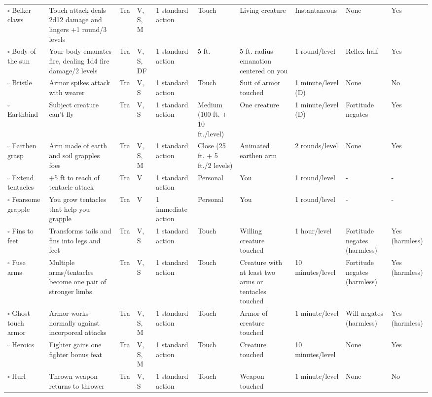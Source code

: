 \documentclass[12pt, a4paper]{article}
\begin{document}
\begin{center}
\begin{longtable}[H]{ p{8em} p{15em} p{2em} p{5em} p{6em} p{6em} p{10em} p{6em} p{5em} p{2em} }
    \(\square\) Belker claws & Touch attack deals 2d12 damage and lingers +1 round/3 levels & Tra & V, S, M & 1 standard action & Touch & Living creature & Instantaneous & None & Yes\\
    \(\square\) Body of the sun & Your body emanates ﬁre, dealing 1d4 ﬁre damage/2 levels & Tra & V, S, DF & 1 standard action & 5 ft. & 5-ft.-radius emanation centered on you & 1 round/level & Reﬂex half & Yes\\
    \(\square\) Bristle & Armor spikes attack with wearer & Tra & V, S & 1 standard action & Touch & Suit of armor touched & 1 minute/level (D) & None & No\\
    \(\square\) Earthbind & Subject creature can’t ﬂy & Tra & V, S & 1 standard action & Medium (100 ft. + 10 ft./level) & One creature & 1 minute/level (D) & Fortitude negates & Yes\\
    \(\square\) Earthen grasp & Arm made of earth and soil grapples foes & Tra & V, S, M & 1 standard action & Close (25 ft. + 5 ft./2 levels) & Animated earthen arm & 2 rounds/level & None & Yes\\
    \(\square\) Extend tentacles & +5 ft to reach of tentacle attack & Tra & V & 1 standard action & Personal & You & 1 round/level & - & -\\
    \(\square\) Fearsome grapple & You grow tentacles that help you grapple & Tra & V & 1 immediate action & Personal & You & 1 round/level & - & -\\
    \(\square\) Fins to feet & Transforms tails and fins into legs and feet & Tra & V, S & 1 standard action & Touch & Willing creature touched & 1 hour/level & Fortitude negates (harmless) & Yes (harmless)\\
    \(\square\) Fuse arms & Multiple arms/tentacles become one pair of stronger limbs & Tra & V, S & 1 standard action & Touch & Creature with at least two arms or tentacles touched & 10 minutes/level & Fortitude negates (harmless) & Yes (harmless)\\
    \(\square\) Ghost touch armor & Armor works normally against incorporeal attacks & Tra & V, S, M & 1 standard action & Touch & Armor of creature touched & 1 minute/level & Will negates (harmless) & Yes (harmless)\\
    \(\square\) Heroics & Fighter gains one ﬁghter bonus feat & Tra & V, S, M & 1 standard action & Touch & Creature touched & 10 minutes/level & None & Yes\\
    \(\square\) Hurl & Thrown weapon returns to thrower & Tra & V, S & 1 standard action & Touch & Weapon touched & 1 minute/level & None & No\\

\end{longtable}
\end{center}
\end{document}
